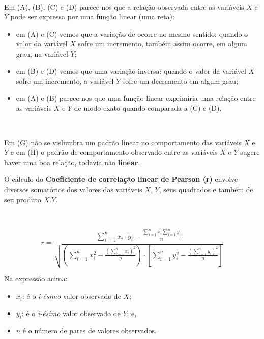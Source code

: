 \documentclass[
]{book}
\providecommand{\tightlist}{%
  \setlength{\itemsep}{0pt}\setlength{\parskip}{0pt}}
\begin{document}
~

Em (A), (B), (C) e (D) parece-nos que a relação observada entre as variáveis \(X\) e \(Y\) pode ser expressa por uma função linear (uma reta):

\hfill\break

\begin{itemize}
\tightlist
\item
  em (A) e (C) vemos que a variação de ocorre no mesmo sentido: quando o valor da variável \(X\) sofre um incremento, também assim ocorre, em algum grau, na variável \(Y\);\\
\item
  em (B) e (D) vemos que uma variação inversa: quando o valor da variável \(X\) sofre um incremento, a variável \(Y\) sofre um decremento em algum grau;\\
\item
  em (A) e (B) parece-nos que uma função linear exprimiria uma relação entre as variáveis \(X\) e \(Y\) de modo exato quando comparada a (C) e (D).
\end{itemize}

~

Em (G) não se vislumbra um padrão linear no comportamento das variáveis \(X\) e \(Y\) e em (H) o padrão de comportamento observado entre as variáveis \(X\) e \(Y\) sugere haver uma boa relação, todavia não \textbf{linear}.

\hfill\break

O cálculo do \textbf{Coeficiente de correlação linear de Pearson (r)} envolve diversos somatórios dos valores das variáveis \(X\), \(Y\), seus quadrados e também de seu produto \(X.Y\).

~

\[
r=\frac{\sum _{i=1}^{n}{x}_{i} \cdot {y}_{i} - \frac{\sum _{i=1}^{n}{x}_{i}\sum _{i=1}^{n}{y}_{i}}{n}}{\sqrt{\left(\sum _{i=1}^{n}{x}_{i}^{2}-\frac{{\left(\sum _{i=1}^{n}{x}_{i}\right)}^{2}}{n}\right)\cdot \left[\sum_{i=1}^{n}{y}_{i}^{2}-\frac{{\left(\sum _{i=1}^{n}{y}_{i}\right)}^{2}}{n}\right]}}
\]

\hfill\break

Na expressão acima:

\begin{itemize}
\tightlist
\item
  \(x_{i}\): é o \emph{i-ésimo} valor observado de \(X\);\\
\item
  \(y_{i}\): é o \emph{i-ésimo} valor observado de \(Y\); e,\\
\item
  \(n\) é o número de pares de valores observados.
\end{itemize}
\end{document}
